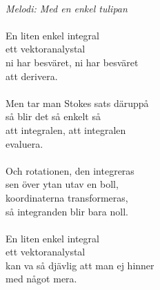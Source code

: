 \\
{\footnotesize\textit{Melodi: Med en enkel tulipan}}\\
\\
En liten enkel integral\\
ett vektoranalystal\\
ni har besväret, ni har besväret\\
att derivera.\\
\\
Men tar man Stokes sats däruppå\\
så blir det så enkelt så\\
att integralen, att integralen\\
evaluera.\\
\\
Och rotationen, den integreras\\
sen över ytan utav en boll,\\
koordinaterna transformeras,\\
så integranden blir bara noll.\\
\\
En liten enkel integral\\
ett vektoranalystal\\
kan va så djävlig att man ej hinner\\
med något mera.
